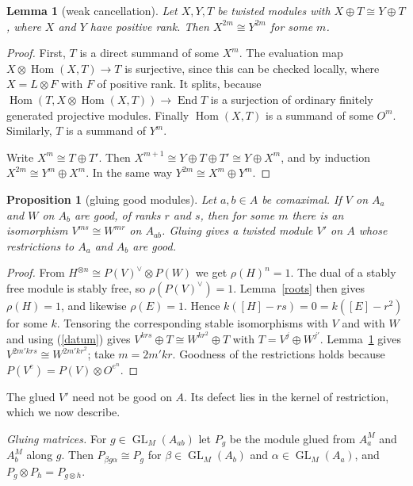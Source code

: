 \documentclass[11pt]{amsart}
\newtheorem{lemma}[theorem]{Lemma}
\newtheorem{proposition}[theorem]{Proposition}
\theoremstyle{definition}
\theoremstyle{remark}
\newcommand{\Hom}{\operatorname{Hom}}
\newcommand{\End}{\operatorname{End}}
\newcommand{\GL}{\operatorname{GL}}
\begin{document}
\begin{lemma}[weak cancellation]\label{efface}
Let $X,Y,T$ be twisted modules with $X\oplus T\cong Y\oplus T$, where
$X$ and $Y$ have positive rank. Then $X^{2m}\cong Y^{2m}$ for some $m$.
\end{lemma}
\begin{proof}
First, $T$ is a direct summand of some $X^m$. The evaluation map
$X\otimes\Hom(X,T)\to T$ is surjective, since this can be checked locally,
where $X=L\otimes F$ with $F$ of positive rank. It splits, because
$\Hom(T,X\otimes\Hom(X,T))\to\End T$ is a surjection of ordinary
finitely generated projective modules. Finally $\Hom(X,T)$ is a summand of
some $O^m$. Similarly, $T$ is a summand of $Y^m$.

Write $X^m\cong T\oplus T'$. Then $X^{m+1}\cong Y\oplus T\oplus T'\cong
Y\oplus X^m$, and by induction $X^{2m}\cong Y^m\oplus X^m$. In the same way
$Y^{2m}\cong X^m\oplus Y^m$.
\end{proof}

\begin{proposition}[gluing good modules]\label{cheap}
Let $a,b\in A$ be comaximal. If $V$ on $A_a$ and $W$ on $A_b$ are good, of
ranks $r$ and $s$, then for some $m$ there is an isomorphism $V^{ms}\cong
W^{mr}$ on $A_{ab}$. Gluing gives a twisted module $V'$ on $A$ whose
restrictions to $A_a$ and $A_b$ are good.
\end{proposition}
\begin{proof}
From $H^{\otimes n}\cong P(V)^\vee\otimes P(W)$ we get $\rho(H)^n=1$. The
dual of a stably free module is stably free, so $\rho(P(V)^\vee)=1$.
Lemma~\ref{roots} then gives $\rho(H)=1$, and likewise $\rho(E)=1$. Hence
$k([H]-rs)=0=k([E]-r^2)$ for some $k$. Tensoring the corresponding stable
isomorphisms with $V$ and with $W$ and using (\ref{datum}) gives
$V^{krs}\oplus T\cong W^{kr^2}\oplus T$ with $T=V^j\oplus W^{j'}$.
Lemma~\ref{efface} gives $V^{2m'krs}\cong W^{2m'kr^2}$; take
$m=2m'kr$. Goodness of the restrictions holds
because $P(V^{e})=P(V)\otimes O^{e^n}$.
\end{proof}

The glued $V'$ need not be good on $A$. Its defect lies in the kernel of
restriction, which we now describe.

\smallskip\noindent\emph{Gluing matrices.} For $g\in\GL_M(A_{ab})$ let $P_g$
be the module glued from $A_a^M$ and $A_b^M$ along $g$. Then $P_{\beta
g\alpha}\cong P_g$ for $\beta\in\GL_M(A_b)$ and $\alpha\in\GL_M(A_a)$, and
$P_g\otimes P_h=P_{g\otimes h}$.
\end{document}
